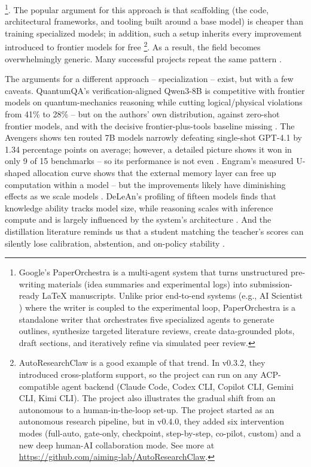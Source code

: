 \cite{2604.05018}\footnote{%
    Google's PaperOrchestra is a multi-agent system that turns unstructured pre-writing materials (idea summaries and experimental logs) into submission-ready LaTeX manuscripts. Unlike prior end-to-end systems (e.g., AI Scientist \cite{Lu2026}) where the writer is coupled to the experimental loop, PaperOrchestra is a standalone writer that orchestrates five specialized agents to generate outlines, synthesize targeted literature reviews, create data-grounded plots, draft sections, and iteratively refine via simulated peer review.
}.
The popular argument for this approach is that scaffolding (the code, architectural frameworks, and tooling built around a base model) is cheaper than training specialized models; in addition, such a setup inherits every improvement introduced to frontier models for free \cite{2605.20025}\footnote{
    AutoResearchClaw is a good example of that trend. In v0.3.2, they introduced cross-platform support, so the project can run on any ACP-compatible agent backend (Claude Code, Codex CLI, Copilot CLI, Gemini CLI, Kimi CLI). The project also illustrates the gradual shift from an autonomous to a human-in-the-loop set-up. The project started as an autonomous research pipeline, but in v0.4.0, they added six intervention modes (full-auto, gate-only, checkpoint, step-by-step, co-pilot, custom) and a new deep human-AI collaboration mode. See more at \url{https://github.com/aiming-lab/AutoResearchClaw}.
}.
As a result, the field becomes overwhelmingly generic. Many successful projects repeat the same pattern \cite{2605.18661}. 

The arguments for a different approach -- specialization -- exist, but with a few caveats. QuantumQA's verification-aligned Qwen3-8B is competitive with frontier models on quantum-mechanics reasoning while cutting logical/physical violations from 41\% to 28\% -- but on the authors' own distribution, against zero-shot frontier models, and with the decisive frontier-plus-tools baseline missing \cite{2604.18176}. The Avengers shows ten routed 7B models narrowly defeating single-shot GPT-4.1 by 1.34 percentage points on average; however, a detailed picture shows it won in only 9 of 15 benchmarks -- so its performance is not even \cite{2505.19797}. Engram's measured U-shaped allocation curve shows that the external memory layer can free up computation within a model -- but the improvements likely have diminishing effects as we scale models \cite{2601.07372}.
DeLeAn's profiling of fifteen models finds that knowledge ability tracks model size, while reasoning scales with inference compute and is largely influenced by the system's architecture \cite{Zhou2026}. And the distillation literature reminds us that a student matching the teacher's scores can silently lose calibration, abstention, and on-policy stability \cite{2604.25110}.

